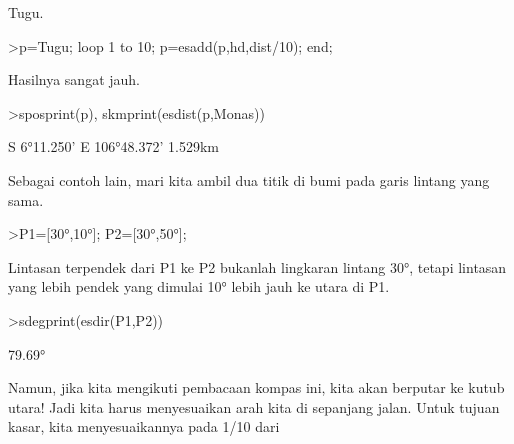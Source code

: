\documentclass[a4paper,10pt]{article}
\begin{document}
\begin{eulernotebook}
\begin{eulercomment}
\begin{eulercomment}
\begin{eulercomment}
\begin{eulercomment}
\begin{eulercomment}
\begin{eulercomment}
\begin{eulercomment}
\begin{eulercomment}
\begin{eulercomment}
\begin{eulercomment}
\begin{eulercomment}
\begin{eulercomment}
\begin{eulercomment}
\begin{eulercomment}
\begin{eulercomment}
\begin{eulercomment}
\begin{eulercomment}
\begin{eulercomment}
\begin{eulercomment}
\begin{eulercomment}
\begin{eulercomment}
\begin{eulercomment}
\begin{eulercomment}
\begin{eulercomment}
\begin{eulercomment}
\begin{eulercomment}
\begin{eulercomment}
\begin{eulercomment}
\begin{eulercomment}
\begin{eulercomment}
\begin{eulercomment}
\begin{eulercomment}
\begin{eulercomment}
\begin{eulercomment}
\begin{eulercomment}
\begin{eulercomment}
\begin{eulercomment}
\begin{eulercomment}
\begin{eulercomment}
\begin{eulercomment}
\begin{eulercomment}
\begin{eulercomment}
\begin{eulercomment}
\begin{eulercomment}
\begin{eulercomment}
\begin{eulercomment}
\begin{eulercomment}
\begin{eulercomment}
\begin{eulercomment}
\begin{eulercomment}
\begin{eulercomment}
\begin{eulercomment}
\begin{eulercomment}
\begin{eulercomment}
\begin{eulercomment}
\begin{eulercomment}
\begin{eulercomment}
\begin{eulercomment}
\begin{eulercomment}
\begin{eulercomment}
\begin{eulercomment}
\begin{eulercomment}
\begin{eulercomment}
\begin{eulercomment}
\begin{eulercomment}
Tugu.
\end{eulercomment}
\begin{eulerprompt}
>p=Tugu; loop 1 to 10; p=esadd(p,hd,dist/10); end;
\end{eulerprompt}
\begin{eulercomment}
Hasilnya sangat jauh.
\end{eulercomment}
\begin{eulerprompt}
>sposprint(p), skmprint(esdist(p,Monas))
\end{eulerprompt}
\begin{euleroutput}
  S 6°11.250' E 106°48.372'
       1.529km
\end{euleroutput}
\begin{eulercomment}
Sebagai contoh lain, mari kita ambil dua titik di bumi pada garis
lintang yang sama.
\end{eulercomment}
\begin{eulerprompt}
>P1=[30°,10°]; P2=[30°,50°];
\end{eulerprompt}
\begin{eulercomment}
Lintasan terpendek dari P1 ke P2 bukanlah lingkaran lintang 30°,
tetapi lintasan yang lebih pendek yang dimulai 10° lebih jauh ke utara
di P1.
\end{eulercomment}
\begin{eulerprompt}
>sdegprint(esdir(P1,P2))
\end{eulerprompt}
\begin{euleroutput}
       79.69°
\end{euleroutput}
\begin{eulercomment}
Namun, jika kita mengikuti pembacaan kompas ini, kita akan berputar ke
kutub utara! Jadi kita harus menyesuaikan arah kita di sepanjang
jalan. Untuk tujuan kasar, kita menyesuaikannya pada 1/10 dari 
\end{eulercomment}
\end{eulercomment}
\end{eulercomment}
\end{eulercomment}
\end{eulercomment}
\end{eulercomment}
\end{eulercomment}
\end{eulercomment}
\end{eulercomment}
\end{eulercomment}
\end{eulercomment}
\end{eulercomment}
\end{eulercomment}
\end{eulercomment}
\end{eulercomment}
\end{eulercomment}
\end{eulercomment}
\end{eulercomment}
\end{eulercomment}
\end{eulercomment}
\end{eulercomment}
\end{eulercomment}
\end{eulercomment}
\end{eulercomment}
\end{eulercomment}
\end{eulercomment}
\end{eulercomment}
\end{eulercomment}
\end{eulercomment}
\end{eulercomment}
\end{eulercomment}
\end{eulercomment}
\end{eulercomment}
\end{eulercomment}
\end{eulercomment}
\end{eulercomment}
\end{eulercomment}
\end{eulercomment}
\end{eulercomment}
\end{eulercomment}
\end{eulercomment}
\end{eulercomment}
\end{eulercomment}
\end{eulercomment}
\end{eulercomment}
\end{eulercomment}
\end{eulercomment}
\end{eulercomment}
\end{eulercomment}
\end{eulercomment}
\end{eulercomment}
\end{eulercomment}
\end{eulercomment}
\end{eulercomment}
\end{eulercomment}
\end{eulercomment}
\end{eulercomment}
\end{eulercomment}
\end{eulercomment}
\end{eulercomment}
\end{eulercomment}
\end{eulercomment}
\end{eulercomment}
\end{eulercomment}
\end{eulercomment}
\end{eulernotebook}
\end{document}
